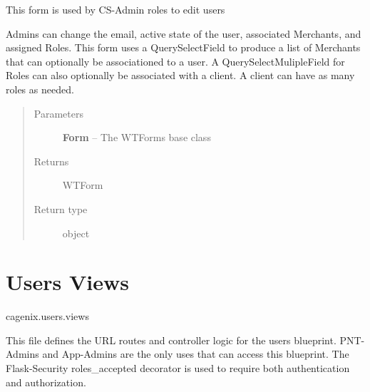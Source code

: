 \documentclass[letterpaper,10pt,english]{sphinxmanual}
\begin{document}

\begin{fulllineitems}
\label{dev-users:cagenix.users.forms.UserEditForm}
This form is used by CS-Admin roles to edit users

Admins can change the email, active state of the user, associated Merchants,
and assigned Roles. This form uses a QuerySelectField to produce a list of
Merchants that can optionally be associationed to a user. A
QuerySelectMulipleField for Roles can also optionally be associated with
a client. A client can have as many roles as needed.
\begin{quote}\begin{description}
\item[{Parameters}] \leavevmode
\textbf{Form} -- The WTForms base class

\item[{Returns}] \leavevmode
WTForm

\item[{Return type}] \leavevmode
object

\end{description}\end{quote}

\end{fulllineitems}



\section{Users Views}
\label{dev-users:users-views-label}\label{dev-users:users-views}\label{dev-users:module-cagenix.users.views}
cagenix.users.views

This file defines the URL routes and controller logic for the users blueprint.
PNT-Admins and App-Admins are the only uses that can access this blueprint.
The Flask-Security roles\_accepted decorator is used to require both
authentication and authorization.
\end{document}
